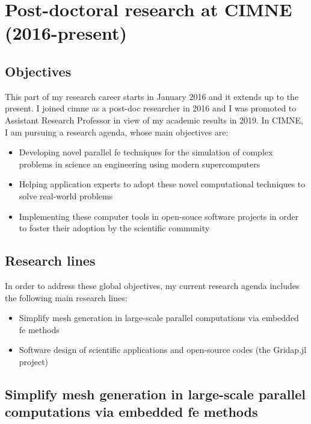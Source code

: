 \documentclass{article}
\begin{document}
\section{Post-doctoral research  at CIMNE (2016-present)} \label{sec:cimne}

\subsection{Objectives}

  This part of my research career starts in January 2016 and it extends up to the present. I joined \ac{cimne} as a post-doc researcher in 2016 and I was promoted to Assistant Research Professor in view of my academic results in 2019. In CIMNE, I am pursuing a research agenda, whose main objectives are:

\begin{itemize}
\item Developing novel parallel \ac{fe} techniques for the simulation of complex problems in science an engineering using modern supercomputers
\item Helping application experts to adopt these novel computational techniques to solve real-world problems
\item Implementing these computer tools in open-souce software projects in order to foster their adoption by the scientific community
\end{itemize}

\subsection{Research lines}

In order to address these global objectives, my current research agenda includes the following main research lines:

\begin{itemize}
\item  Simplify mesh generation in large-scale parallel computations via embedded \ac{fe} methods
\item Software design of scientific applications and open-source codes (the Gridap.jl project)
\end{itemize}

\subsection{Simplify mesh generation in large-scale parallel computations via embedded \ac{fe} methods}
\end{document}
